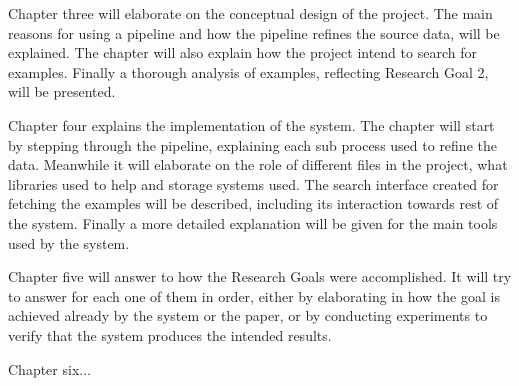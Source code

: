 Chapter three will elaborate on the conceptual design of the project. The main reasons for using a pipeline and how the pipeline refines the source data, will be explained. The chapter will also explain how the project intend to search for examples. Finally a thorough analysis of examples, reflecting Research Goal 2, will be presented.

Chapter four explains the implementation of the system. The chapter will start by stepping through the pipeline, explaining each sub process used to refine the data. Meanwhile it will elaborate on the role of different files in the project, what libraries used to help and storage systems used. The search interface created for fetching the examples will be described, including its interaction towards rest of the system. Finally a more detailed explanation will be given for the main tools used by the system.

Chapter five will answer to how the Research Goals were accomplished. It will try to answer for each one of them in order, either by elaborating in how the goal is achieved already by the system or the paper, or by conducting experiments to verify that the system produces the intended results.

Chapter six...


\cleardoublepage